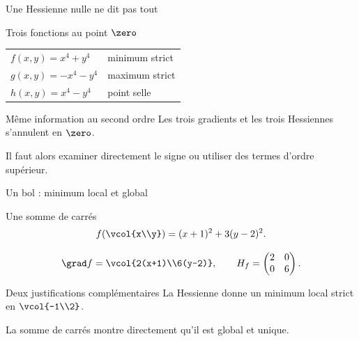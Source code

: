 \begin{frame}[t]{Une Hessienne nulle ne dit pas tout}
\coursanalyse
\begin{exemple}{Trois fonctions au point $\zero$}
\begin{tabular}{@{}ll@{}}
$f(x,y)=x^4+y^4$ & minimum strict\\[4mm]
$g(x,y)=-x^4-y^4$ & maximum strict\\[4mm]
$h(x,y)=x^4-y^4$ & point selle
\end{tabular}
\end{exemple}
\begin{resultat}{Même information au second ordre}
Les trois gradients et les trois Hessiennes s’annulent en $\zero$.
\end{resultat}\vfill Il faut alors examiner directement le signe ou utiliser des termes d’ordre supérieur.
\end{frame}

\begin{frame}[t]{Un bol : minimum local et global}
\coursanalyse
\begin{exemple}{Une somme de carrés}
\[f\!\left(\vcol{x\\y}\right)=(x+1)^2+3(y-2)^2.\]
\end{exemple}
\[\grad f=\vcol{2(x+1)\\6(y-2)},\qquad H_f=\begin{pmatrix}2&0\\0&6\end{pmatrix}.\]
\begin{resultat}{Deux justifications complémentaires}
La Hessienne donne un minimum local strict en $\vcol{-1\\2}$.
\par La somme de carrés montre directement qu’il est global et unique.
\end{resultat}
\end{frame}

